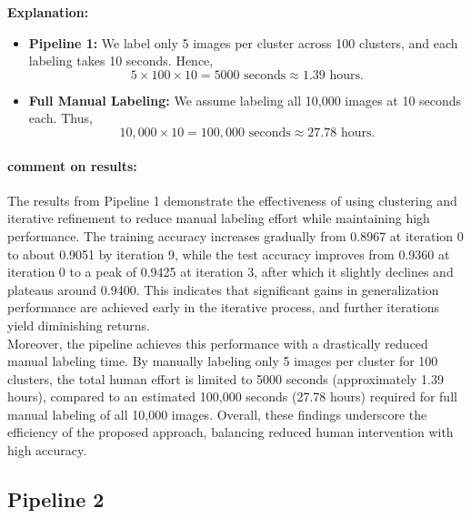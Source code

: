 \documentclass[12pt]{article}
\begin{document}
\begin{enumerate}
    \noindent
    \textbf{Explanation:} 
    \begin{itemize}
        \item \textbf{Pipeline 1:}  
        We label only 5 images per cluster across 100 clusters, and each labeling takes 10 seconds. 
        Hence, 
        \[
        5 \times 100 \times 10 = 5000 \text{ seconds} \approx 1.39 \text{ hours}.
        \]
        \item \textbf{Full Manual Labeling:}  
        We assume labeling all 10,000 images at 10 seconds each. Thus, 
        \[
        10{,}000 \times 10 = 100{,}000 \text{ seconds} \approx 27.78 \text{ hours}.
        \]
    \end{itemize}
\end{enumerate}

\paragraph{comment on results:}
The results from Pipeline 1 demonstrate the effectiveness of using clustering and iterative refinement to reduce manual labeling effort while maintaining high performance. The training accuracy increases gradually from 0.8967 at iteration 0 to about 0.9051 by iteration 9, while the test accuracy improves from 0.9360 at iteration 0 to a peak of 0.9425 at iteration 3, after which it slightly declines and plateaus around 0.9400. This indicates that significant gains in generalization performance are achieved early in the iterative process, and further iterations yield diminishing returns. \\
Moreover, the pipeline achieves this performance with a drastically reduced manual labeling time. By manually labeling only 5 images per cluster for 100 clusters, the total human effort is limited to 5000 seconds (approximately 1.39 hours), compared to an estimated 100,000 seconds (27.78 hours) required for full manual labeling of all 10,000 images. Overall, these findings underscore the efficiency of the proposed approach, balancing reduced human intervention with high accuracy.



\subsection*{Pipeline 2}
\end{document}
